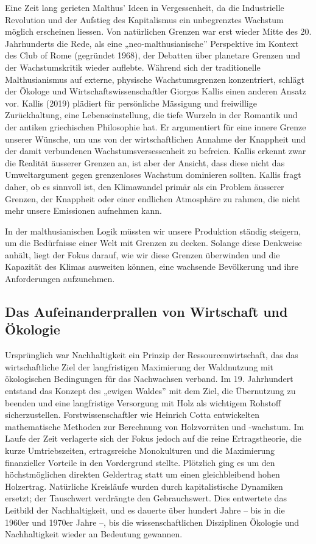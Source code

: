 \documentclass[
  nswissgerman,
  a4paper,
  DIV=11,
  numbers=noendperiod,
  oneside,
  openany]{scrreprt}
\begin{document}
Eine Zeit lang gerieten Malthus' Ideen in Vergessenheit, da die
Industrielle Revolution und der Aufstieg des Kapitalismus ein
unbegrenztes Wachstum möglich erscheinen liessen. Von natürlichen
Grenzen war erst wieder Mitte des 20. Jahrhunderts die Rede, als eine
„neo-malthusianische'' Perspektive im Kontext des Club of Rome
(gegründet 1968), der Debatten über planetare Grenzen und der
Wachstumskritik wieder auflebte. Während sich der traditionelle
Malthusianismus auf externe, physische Wachstumsgrenzen konzentriert,
schlägt der Ökologe und Wirtschaftswissenschaftler Giorgos Kallis einen
anderen Ansatz vor. Kallis (2019) plädiert für persönliche Mässigung und
freiwillige Zurückhaltung, eine Lebenseinstellung, die tiefe Wurzeln in
der Romantik und der antiken griechischen Philosophie hat. Er
argumentiert für eine innere Grenze unserer Wünsche, um uns von der
wirtschaftlichen Annahme der Knappheit und der damit verbundenen
Wachstumsversessenheit zu befreien. Kallis erkennt zwar die Realität
äusserer Grenzen an, ist aber der Ansicht, dass diese nicht das
Umweltargument gegen grenzenloses Wachstum dominieren sollten. Kallis
fragt daher, ob es sinnvoll ist, den Klimawandel primär als ein Problem
äusserer Grenzen, der Knappheit oder einer endlichen Atmosphäre zu
rahmen, die nicht mehr unsere Emissionen aufnehmen kann.

In der malthusianischen Logik müssten wir unsere Produktion ständig
steigern, um die Bedürfnisse einer Welt mit Grenzen zu decken. Solange
diese Denkweise anhält, liegt der Fokus darauf, wie wir diese Grenzen
überwinden und die Kapazität des Klimas ausweiten können, eine wachsende
Bevölkerung und ihre Anforderungen aufzunehmen.

\subsection{Das Aufeinanderprallen von Wirtschaft und
Ökologie}\label{das-aufeinanderprallen-von-wirtschaft-und-uxf6kologie}

Ursprünglich war Nachhaltigkeit ein Prinzip der Ressourcenwirtschaft,
das das wirtschaftliche Ziel der langfristigen Maximierung der
Waldnutzung mit ökologischen Bedingungen für das Nachwachsen verband. Im
19. Jahrhundert entstand das Konzept des „ewigen Waldes'' mit dem Ziel,
die Übernutzung zu beenden und eine langfristige Versorgung mit Holz als
wichtigem Rohstoff sicherzustellen. Forstwissenschaftler wie Heinrich
Cotta entwickelten mathematische Methoden zur Berechnung von
Holzvorräten und -wachstum. Im Laufe der Zeit verlagerte sich der Fokus
jedoch auf die reine Ertragstheorie, die kurze Umtriebszeiten,
ertragsreiche Monokulturen und die Maximierung finanzieller Vorteile in
den Vordergrund stellte. Plötzlich ging es um den höchstmöglichen
direkten Geldertrag statt um einen gleichbleibend hohen Holzertrag.
Natürliche Kreisläufe wurden durch kapitalistische Dynamiken ersetzt;
der Tauschwert verdrängte den Gebrauchswert. Dies entwertete das
Leitbild der Nachhaltigkeit, und es dauerte über hundert Jahre -- bis in
die 1960er und 1970er Jahre --, bis die wissenschaftlichen Disziplinen
Ökologie und Nachhaltigkeit wieder an Bedeutung gewannen.
\end{document}
